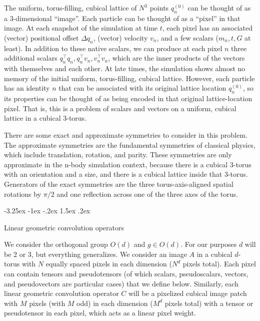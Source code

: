 \documentclass{article}
\makeatletter
\theoremstyle{definition}
\renewcommand\section{\@startsection {section}{1}{\z@}%
  {-3.25ex \@plus -1ex \@minus -.2ex}%
  {1.5ex \@plus .2ex}%
  {\raggedright\normalfont\large\bfseries}}
\makeatother
\begin{document}
The uniform, torus-filling, cubical lattice of $N^3$ points $q^{(0)}_n$ can be thought of as a 3-dimensional ``image''.
Each particle can be thought of as a ``pixel'' in that image.
At each snapshot of the simulation at time $t$, each pixel has an associated (vector) positional offset $\Delta q_n$, (vector) velocity $v_n$, and a few scalars ($m_n, t, G$ at least).
In addition to these native scalars, we can produce at each pixel $n$ three additional scalars $q_n^\top q_n, q_n^\top v_n, v_n^\top v_n$, which are the inner products of the vectors with themselves and each other.
At late times, the simulation shows almost no memory of the initial uniform, torus-filling, cubical lattice.
However, each particle has an identity $n$ that can be associated with its original lattice location $q^{(0)}_n$, so its properties can be thought of as being encoded in that original lattice-location pixel.
That is, this is a problem of scalars and vectors on a uniform, cubical lattice in a cubical 3-torus.

There are some exact and approximate symmetries to consider in this problem.
The approximate symmetries are the fundamental symmetries of classical physics, which include translation, rotation, and parity.
These symmetries are only approximate in the n-body simulation context, because there is a cubical 3-torus with an orientation and a size, and there is a cubical lattice inside that 3-torus.
Generators of the exact symmetries are the three torus-axis-aligned spatial rotations by $\pi/2$ and one reflection across one of the three axes of the torus.

\section{Linear geometric convolution operators}

We consider the orthogonal group $O(d)$ and $g\in O(d)$. For our purposes $d$ will be 2 or 3, but everything generalizes.  
We consider an image $A$ in a cubical $d$-torus with $N$ equally spaced pixels in each dimension ($N^d$ pixels total). Each pixel can contain tensors and pseudotensors (of which scalars, pseudoscalars, vectors, and pseudovectors are particular cases) that we define below.
Similarly, each linear geometric convolution operator $C$ will be a pixelized cubical image patch with $M$ pixels (with $M$ odd) in each dimension ($M^d$ pixels total) with a tensor or pseudotensor in each pixel, which acts as a linear pixel weight.
\end{document}
